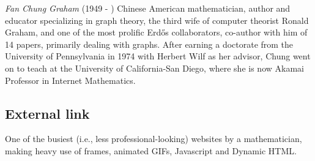 \documentclass[12pt]{article}
\begin{document}
\emph{Fan Chung Graham} (1949 - ) Chinese American mathematician, author and educator specializing in graph theory, the third wife of computer theorist Ronald Graham, and one of the most prolific Erd\H{o}s collaborators, co-author with him of 14 papers, primarily dealing with graphs. After earning a doctorate from the University of Pennsylvania in 1974 with Herbert Wilf as her advisor, Chung went on to teach at the University of California-San Diego, where she is now Akamai Professor in Internet Mathematics.

\subsection{External link}
 One of the busiest (i.e., less professional-looking) websites by a mathematician, making heavy use of frames, animated GIFs, Javascript and Dynamic HTML.
\end{document}
